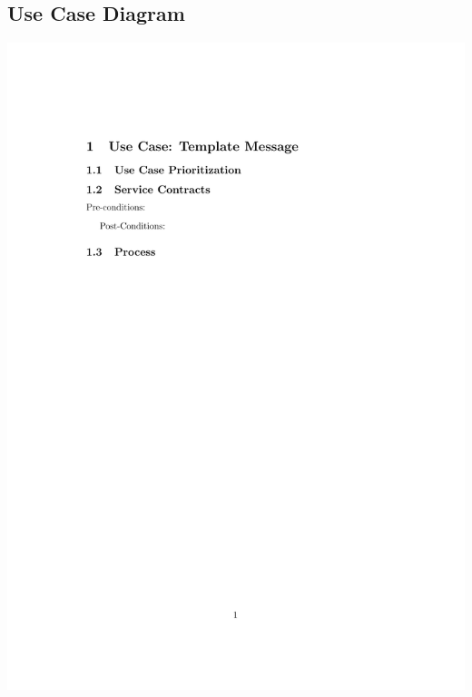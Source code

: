 \documentclass[a4paper,12pt]{article}
\begin{document}
\subsection{Use Case Diagram}
\includegraphics[width=\textwidth]{12260429_TemplateMessaging}
\end{document}
